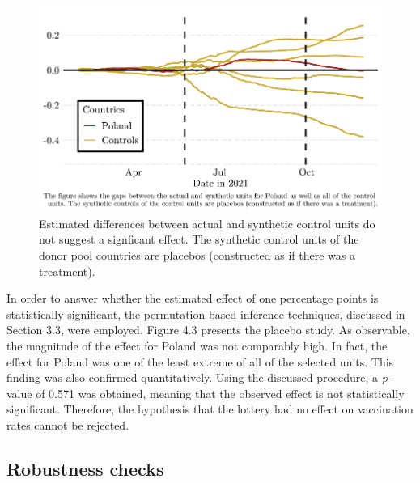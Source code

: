\documentclass{scrbook}
\begin{document}
\begin{figure}[h]
\caption[Placebo plot of Poland and donor pool]{Estimated differences between actual and synthetic control units do not suggest a signficant effect. The synthetic control units of the donor pool countries are placebos (constructed as if there was a treatment).}

\begin{center}\includegraphics{bachelor_thesis_files/figure-latex/unnamed-chunk-4-1} \end{center}
\end{figure}

\vspace{-0.2cm}

In order to answer whether the estimated effect of one percentage points
is statistically significant, the permutation based inference
techniques, discussed in Section 3.3, were employed. Figure 4.3 presents
the placebo study. As observable, the magnitude of the effect for Poland
was not comparably high. In fact, the effect for Poland was one of the
least extreme of all of the selected units. This finding was also
confirmed quantitatively. Using the discussed procedure, a
\textit{p}-value of 0.571 was obtained, meaning that the observed effect
is not statistically significant. Therefore, the hypothesis that the
lottery had no effect on vaccination rates cannot be rejected.

\subsection*{Robustness checks}
\end{document}
